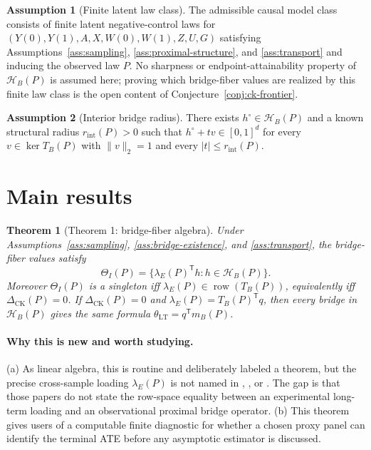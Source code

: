 \documentclass[11pt]{article}
\newcommand{\transpose}{\mathsf{T}}
\newcommand{\calH}{\mathcal{H}}
\theoremstyle{definition}
\newtheorem{assumption}{Assumption}
\theoremstyle{plain}
\newtheorem{theorem}{Theorem}
\theoremstyle{remark}
\begin{document}
\begin{assumption}[Finite latent law class]\label{ass:realization}
The admissible causal model class consists of finite latent
negative-control laws for \((Y(0),Y(1),A,X,W(0),W(1),Z,U,G)\) satisfying
Assumptions~\ref{ass:sampling}, \ref{ass:proximal-structure}, and
\ref{ass:transport} and inducing the observed law \(P\).  No sharpness or
endpoint-attainability property of \(\calH_B(P)\) is assumed here; proving
which bridge-fiber values are realized by this finite law class is the open
content of Conjecture~\ref{conj:ck-frontier}.
\end{assumption}

\begin{assumption}[Interior bridge radius]\label{ass:interior-radius}
There exists \(h^\circ\in\calH_B(P)\) and a known structural radius
\(r_{\mathrm{int}}(P)>0\) such that
\(h^\circ+t v\in[0,1]^d\) for every \(v\in\ker T_B(P)\) with
\(\|v\|_2=1\) and every \(|t|\le r_{\mathrm{int}}(P)\).
\end{assumption}

\section{Main results}
\begin{theorem}[Theorem 1: bridge-fiber algebra]\label{thm:fiber-algebra}
Under Assumptions~\ref{ass:sampling}, \ref{ass:bridge-existence}, and
\ref{ass:transport}, the bridge-fiber values satisfy
\[
\Theta_I(P)=
\{\lambda_E(P)^\transpose h:h\in\calH_B(P)\}.
\]
Moreover \(\Theta_I(P)\) is a singleton iff
\(\lambda_E(P)\in\operatorname{row}(T_B(P))\), equivalently iff
\(\Delta_{\mathrm{CK}}(P)=0\).  If \(\Delta_{\mathrm{CK}}(P)=0\) and
\(\lambda_E(P)=T_B(P)^\transpose q\), then every bridge in \(\calH_B(P)\)
gives the same formula \(\theta_{\mathrm{LT}}=q^\transpose m_B(P)\).
\end{theorem}
\paragraph{Why this is new and worth studying.}
(a) As linear algebra, this is routine and deliberately labeled a theorem,
but the precise cross-sample loading \(\lambda_E(P)\) is not named in
\citet{AtheyChettyImbensKang2019}, \citet{ImbensKallusMaoWang2025}, or
\citet{ZhangLiMiaoTchetgen2023}.  The gap is that those papers do not state
the row-space equality between an experimental long-term loading and an
observational proximal bridge operator.  (b) This theorem gives users of
\citet{ImbensKallusMaoWang2025} a computable finite diagnostic for whether a
chosen proxy panel can identify the terminal ATE before any asymptotic
estimator is discussed.
\end{document}
